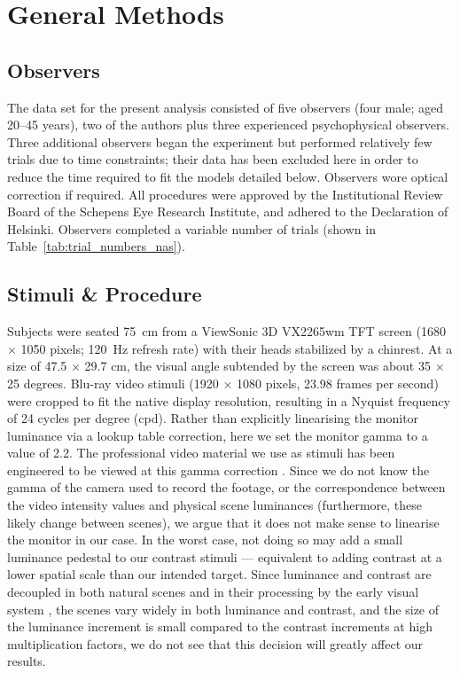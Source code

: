 \documentclass[11pt,a4paper]{article}
\begin{document}
\section{General Methods}

\subsection{Observers}

The data set for the present analysis consisted of five observers (four male; aged 20--45 years), two of the authors plus three experienced psychophysical observers.
Three additional observers began the experiment but performed relatively few trials due to time constraints; their data has been excluded here in order to reduce the time required to fit the models detailed below.
Observers wore optical correction if required.
All procedures were approved by the Institutional Review Board of the Schepens Eye Research Institute, and adhered to the Declaration of Helsinki.
Observers completed a variable number of trials (shown in Table~\ref{tab:trial_numbers_nas}).




\subsection{Stimuli \& Procedure}

Subjects were seated 75~cm from a ViewSonic 3D VX2265wm TFT screen (1680 $\times$ 1050 pixels; 120~Hz refresh rate) with their heads stabilized by a chinrest.
At a size of 47.5 $\times$ 29.7 cm, the visual angle subtended by the screen was about 35 $\times$ 25 degrees.
Blu-ray video stimuli (1920 $\times$ 1080 pixels, 23.98 frames per second) were cropped to fit the native display resolution, resulting in a Nyquist frequency of 24 cycles per degree (cpd).
Rather than explicitly linearising the monitor luminance via a lookup table correction, here we set the monitor gamma to a value of 2.2.
The professional video material we use as stimuli has been engineered to be viewed at this gamma correction \citep{Poyn03}.
Since we do not know the gamma of the camera used to record the footage, or the correspondence between the video intensity values and physical scene luminances (furthermore, these likely change between scenes), we argue that it does not make sense to linearise the monitor in our case.
In the worst case, not doing so may add a small luminance pedestal to our contrast stimuli --- equivalent to adding contrast at a lower spatial scale than our intended target.
Since luminance and contrast are decoupled in both natural scenes and in their processing by the early visual system \citep{Mante2005}, the scenes vary widely in both luminance and contrast, and the size of the luminance increment is small compared to the contrast increments at high multiplication factors, we do not see that this decision will greatly affect our results.
\end{document}

